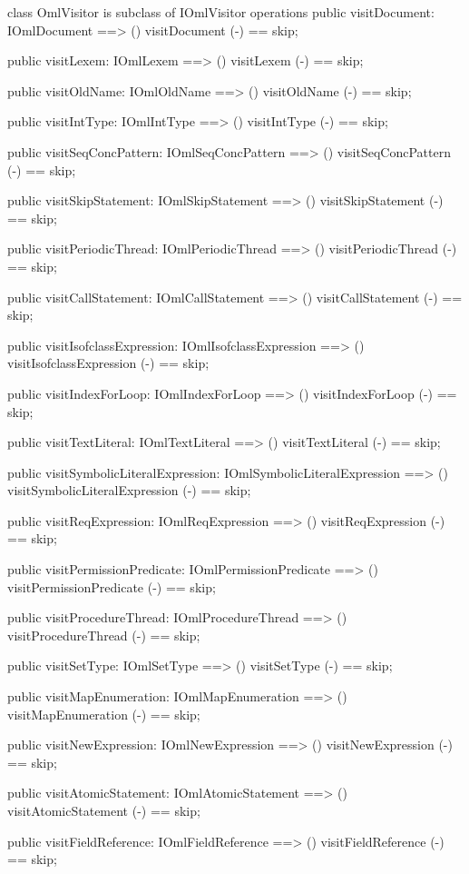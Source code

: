 \begin{vdm_al}
class OmlVisitor is subclass of IOmlVisitor
operations
  public visitDocument: IOmlDocument ==> ()
  visitDocument (-) == skip;

  public visitLexem: IOmlLexem ==> ()
  visitLexem (-) == skip;

  public visitOldName: IOmlOldName ==> ()
  visitOldName (-) == skip;

  public visitIntType: IOmlIntType ==> ()
  visitIntType (-) == skip;

  public visitSeqConcPattern: IOmlSeqConcPattern ==> ()
  visitSeqConcPattern (-) == skip;

  public visitSkipStatement: IOmlSkipStatement ==> ()
  visitSkipStatement (-) == skip;

  public visitPeriodicThread: IOmlPeriodicThread ==> ()
  visitPeriodicThread (-) == skip;

  public visitCallStatement: IOmlCallStatement ==> ()
  visitCallStatement (-) == skip;

  public visitIsofclassExpression: IOmlIsofclassExpression ==> ()
  visitIsofclassExpression (-) == skip;

  public visitIndexForLoop: IOmlIndexForLoop ==> ()
  visitIndexForLoop (-) == skip;

  public visitTextLiteral: IOmlTextLiteral ==> ()
  visitTextLiteral (-) == skip;

  public visitSymbolicLiteralExpression: IOmlSymbolicLiteralExpression ==> ()
  visitSymbolicLiteralExpression (-) == skip;

  public visitReqExpression: IOmlReqExpression ==> ()
  visitReqExpression (-) == skip;

  public visitPermissionPredicate: IOmlPermissionPredicate ==> ()
  visitPermissionPredicate (-) == skip;

  public visitProcedureThread: IOmlProcedureThread ==> ()
  visitProcedureThread (-) == skip;

  public visitSetType: IOmlSetType ==> ()
  visitSetType (-) == skip;

  public visitMapEnumeration: IOmlMapEnumeration ==> ()
  visitMapEnumeration (-) == skip;

  public visitNewExpression: IOmlNewExpression ==> ()
  visitNewExpression (-) == skip;

  public visitAtomicStatement: IOmlAtomicStatement ==> ()
  visitAtomicStatement (-) == skip;

  public visitFieldReference: IOmlFieldReference ==> ()
  visitFieldReference (-) == skip;


\end{vdm_al}
